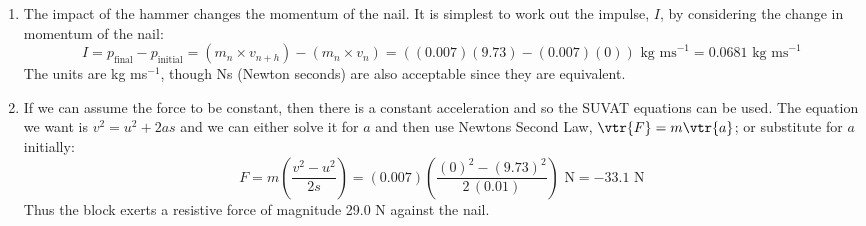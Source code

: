 \begin{problem}[A1964AMIQ3a]
{\begin{enumerate}
\begin{equation*}
\end{equation*}
	\item The impact of the hammer changes the momentum of the nail. It is simplest to work out the impulse, $I$, by considering the change in momentum of the nail:
\begin{equation*}
 I = p_{\text{final}} - p_{\text{initial}} = (m_{n} \times v_{n + h}) - (m_{n} \times v_{n}) = ((0.007)(9.73) - (0.007)(0)) \text{ kg ms}^{-1} = 0.0681  \text{ kg ms}^{-1} 
  \end{equation*}
The units are kg ms$^{-1}$, though Ns (Newton seconds) are also acceptable since they are equivalent.
	\item If we can assume the force to be constant, then there is a constant acceleration and so the SUVAT equations can be used. The equation we want is $v^{2} = u^{2} + 2as$ and we can either solve it for $a$ and then use Newtons Second Law, $\vtr{F} = m\vtr{a}$; or substitute for $a$ initially:
\begin{equation*} 
F = m \left( \frac{v^{2} - u^{2}}{2s} \right) = (0.007) \left( \frac{ (0)^{2} - (9.73)^{2}}{2 \,(0.01)} \right) \text{ N} = -33.1 \text{ N}
\end{equation*}
Thus the block exerts a resistive force of magnitude 29.0 N against the nail.
\end{enumerate}
}
\end{problem}